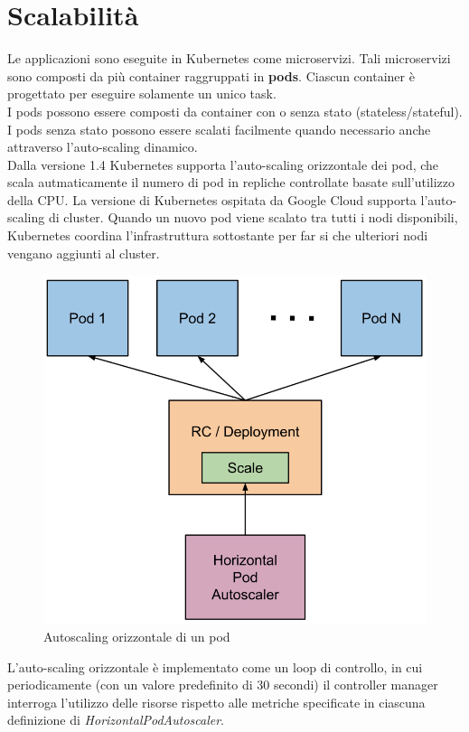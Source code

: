 \documentclass[12pt, a4paper]{report}
\begin{document}
\section{Scalabilità}
Le applicazioni sono eseguite in Kubernetes come microservizi. Tali microservizi sono composti da più container raggruppati in \textbf{pods}. Ciascun container è progettato per eseguire solamente un unico task.\\
I pods possono essere composti da container con o senza stato (stateless/stateful). I pods senza stato possono essere scalati facilmente quando necessario anche attraverso l'auto-scaling dinamico.\\
Dalla versione 1.4 Kubernetes supporta l'auto-scaling orizzontale dei pod, che scala autmaticamente il numero di pod in repliche controllate basate sull'utilizzo della CPU. La versione di Kubernetes ospitata da Google Cloud supporta l'auto-scaling di cluster. Quando un nuovo pod viene scalato tra tutti i nodi disponibili, Kubernetes coordina l'infrastruttura sottostante per far si che ulteriori nodi vengano aggiunti al cluster. \\
\begin{figure}
  \begin{center}
  \includegraphics[scale = 0.7]{Images/horizontal-pod-autoscaler}
  \caption{Autoscaling orizzontale di un pod}
  \end{center}
\end{figure}
L'auto-scaling orizzontale è implementato come un loop di controllo, in cui periodicamente (con un valore predefinito di 30 secondi) il controller manager interroga l'utilizzo delle risorse rispetto alle metriche specificate in ciascuna definizione di \textit{HorizontalPodAutoscaler}.
\end{document}
